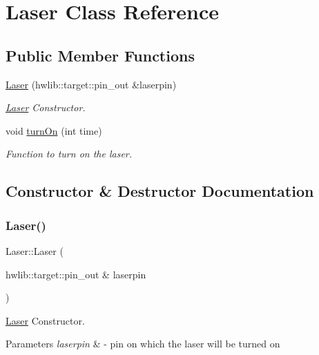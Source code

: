 \hypertarget{class_laser}{}\section{Laser Class Reference}
\label{class_laser}
\subsection*{Public Member Functions}
\begin{DoxyCompactItemize}
\item 
\hyperlink{class_laser_aa72948b3635c3be2109741af988af88a}{Laser} (hwlib\+::target\+::pin\+\_\+out \&laserpin)
\begin{DoxyCompactList}\small\item\em \hyperlink{class_laser}{Laser} Constructor. \end{DoxyCompactList}\item 
void \hyperlink{class_laser_a8203b49ef026606ec58976d23c5b5bb9}{turn\+On} (int time)
\begin{DoxyCompactList}\small\item\em Function to turn on the laser. \end{DoxyCompactList}\end{DoxyCompactItemize}


\subsection{Constructor \& Destructor Documentation}
\mbox{\label{class_laser_aa72948b3635c3be2109741af988af88a}} 
\subsubsection{\texorpdfstring{Laser()}{Laser()}}
{\footnotesize\ttfamily Laser\+::\+Laser (\begin{DoxyParamCaption}\item[{hwlib\+::target\+::pin\+\_\+out \&}]{laserpin }\end{DoxyParamCaption})}



\hyperlink{class_laser}{Laser} Constructor. 


\begin{DoxyParams}{Parameters}
{\em laserpin} & -\/ pin on which the laser will be turned on \\
\hline
\end{DoxyParams}


